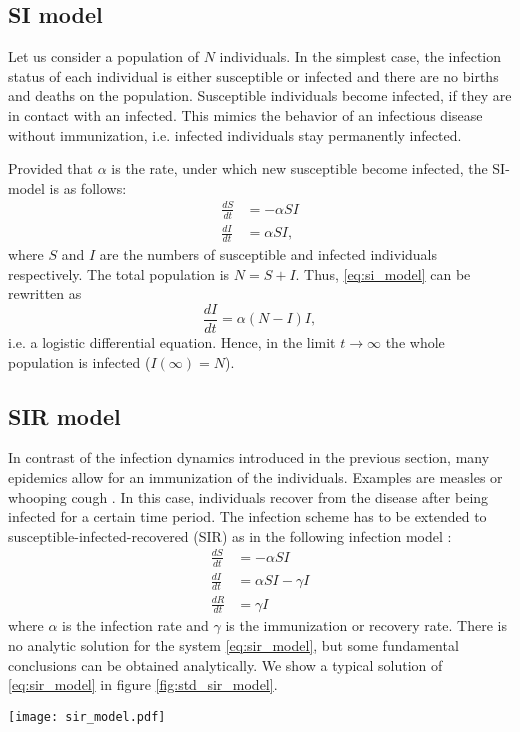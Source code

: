 \documentclass[openright,twoside,headsepline]{scrbook}
\begin{document}
\subsection{SI model}\label{sec:si_model}
Let us consider a population of $N$ individuals.
In the simplest case, the infection status of each individual is either susceptible or infected and there are no births and deaths on the population.
Susceptible individuals become infected, if they are in contact with an infected.
This mimics the behavior of an infectious disease without immunization, i.e. infected individuals stay permanently infected.

Provided that $\alpha $ is the rate, under which new susceptible become infected, the SI-model is as follows:
\begin{align}\label{eq:si_model}
\frac{dS}{dt} &= -\alpha SI \nonumber \\
\frac{dI}{dt} &= \alpha SI,
\end{align}
where $S$ and $I$ are the numbers of susceptible and infected individuals respectively.
The total population is $N=S+I$.
Thus, \eqref{eq:si_model} can be rewritten as
$$
\frac{dI}{dt}=\alpha (N-I)I,
$$
i.e. a logistic differential equation.
Hence, in the limit $t\rightarrow \infty $ the whole population is infected ($I(\infty )=N$). 

\subsection{SIR model}\label{sec:sir_model}
In contrast of the infection dynamics introduced in the previous section, many epidemics allow for an immunization of the individuals.
Examples are measles or whooping cough \cite{grenfell:92} \cite{andersonmay:92}.
In this case, individuals recover from the disease after being infected for a certain time period.
The infection scheme has to be extended to susceptible-infected-recovered (SIR) as in the following infection model \cite{kermack:27}:
\begin{align}\label{eq:sir_model}
\frac{dS}{dt} &= -\alpha SI \nonumber \\
\frac{dI}{dt} &= \alpha SI -\gamma I \nonumber \\
\frac{dR}{dt} &= \gamma I
\end{align}
where $\alpha $ is the infection rate and $\gamma $ is the immunization or recovery rate.
There is no analytic solution for the system \eqref{eq:sir_model}, but some fundamental conclusions can be obtained analytically.
We show a typical solution of \eqref{eq:sir_model} in figure \ref{fig:std_sir_model}.
%
\begin{SCfigure}%
\texttt{[image: sir\_model.pdf]}
\caption{Solution of the susceptible-infected-recovered (SIR) model \eqref{eq:sir_model}.
The number of infected shows that the spreading process is a single event.
Note that a fraction of the population is still susceptible at the end of the process.
Parameters: $\alpha = 3$, $\gamma = 1$, $N=300$, $S_0=1$.}
\label{fig:std_sir_model}
\end{SCfigure}
%
\end{document}
